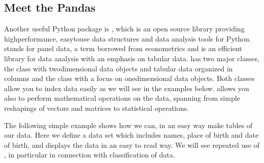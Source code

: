 \documentclass[letterpaper,10pt,english]{sphinxmanual}
\begin{document}
\subsection{Meet the Pandas}
\label{\detokenize{chapter3:meet-the-pandas}}








Another useful Python package is
, which is an open source library
providing high\sphinxhyphen{}performance, easy\sphinxhyphen{}to\sphinxhyphen{}use data structures and data
analysis tools for Python.  stands for panel data, a term borrowed from econometrics and is an efficient library for data analysis with an emphasis on tabular data.
 has two major classes, the  class with two\sphinxhyphen{}dimensional data objects and tabular data organized in columns and the class  with a focus on one\sphinxhyphen{}dimensional data objects. Both classes allow you to index data easily as we will see in the examples below.
 allows you also to perform mathematical operations on the data, spanning from simple reshapings of vectors and matrices to statistical operations.

The following simple example shows how we can, in an easy way make tables of our data. Here we define a data set which includes names, place of birth and date of birth, and displays the data in an easy to read way. We will see repeated use of , in particular in connection with classification of data.
\end{document}
